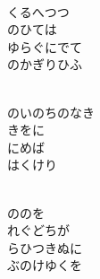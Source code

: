 \documentclass[10pt,b5j]{tarticle} %
\begin{document}
\begin{enumerate}
\begin{minipage}[c]{\blocksize}
    \end{minipage}
    \begin{minipage}[c]{\blocksize}
        
        \vspace{\linespace}
        \item~\\
        くるへつつ\\
        のひては\\
        ゆらぐにでて\\
        のかぎりひふ
        
    \end{minipage}
    \begin{minipage}[c]{\blocksize}
        
        \vspace{\linespace}
        \item~\\
        のいのちのなき\\
        きをに\\
        にめば\\
        はくけり
        
    \end{minipage}
    \begin{minipage}[c]{\blocksize}
        
        \vspace{\linespace}
        \item~\\
        ののを\\
        れぐどちが\\
        らひつきぬに\\
        ぶのけゆくを
        
    \end{minipage}
    \begin{minipage}[c]{\blocksize}
        

\end{minipage}
\end{enumerate}
\end{document}
